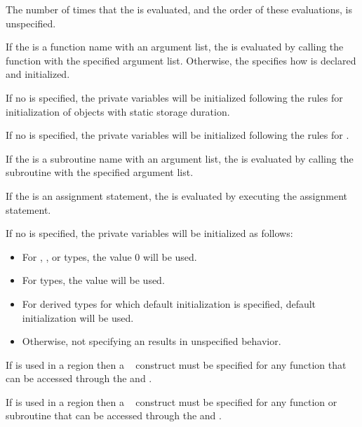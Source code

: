{{{{The number of times that the  is evaluated, and the order of these 
evaluations, is unspecified.

\ccppspecificstart
If the  is a function name with an argument list, the  is 
evaluated by calling the function with the specified argument list. Otherwise, the 
 specifies how  is declared and initialized.
\ccppspecificend
\bigskip

\cspecificstart
If no  is specified, the private variables will be initialized following the 
rules for initialization of objects with static storage duration.
\cspecificend

\cppspecificstart
If no  is specified, the private variables will be initialized following the 
rules for .
\cppspecificend
\bigskip

\fortranspecificstart
If the  is a subroutine name with an argument list, the  is 
evaluated by calling the subroutine with the specified argument list.

If the  is an assignment statement, the  is evaluated by 
executing the assignment statement.

If no  is specified, the private variables will be initialized as follows:
\begin{itemize}
\item For , , or  types, the value 0 will be used.
\item For  types, the value  will be used.
\item For derived types for which default initialization is specified, default initialization 
will be used.
\item Otherwise, not specifying an  results in unspecified behavior.
\end{itemize}
\fortranspecificend
\bigskip

\ccppspecificstart
If  is used in a  region then a ~ construct 
must be specified for any function that can be accessed through the  and 
.
\ccppspecificend
\bigskip

\fortranspecificstart
If  is used in a  region then a ~ construct 
must be specified for any function or subroutine that can be accessed through the  
and .
\fortranspecificend

}}}}
